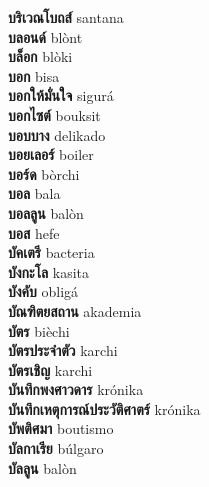 \textbf{ บริเวณโบถส์  } santana \\
\textbf{ บลอนด์  } blònt \\
\textbf{ บล็อก  } blòki \\
\textbf{ บอก  } bisa \\
\textbf{ บอกให้มั่นใจ  } sigurá \\
\textbf{ บอกไซต์  } bouksit \\
\textbf{ บอบบาง  } delikado \\
\textbf{ บอยเลอร์  } boiler \\
\textbf{ บอร์ด  } bòrchi \\
\textbf{ บอล  } bala \\
\textbf{ บอลลูน  } balòn \\
\textbf{ บอส  } hefe \\
\textbf{ บัคเตรี  } bacteria \\
\textbf{ บังกะโล  } kasita \\
\textbf{ บังคับ  } obligá \\
\textbf{ บัณฑิตยสถาน  } akademia \\
\textbf{ บัตร  } bièchi \\
\textbf{ บัตรประจำตัว  } karchi \\
\textbf{ บัตรเชิญ  } karchi \\
\textbf{ บันทึกพงศาวดาร  } krónika \\
\textbf{ บันทึกเหตุการณ์ประวัติศาตร์  } krónika \\
\textbf{ บัพติศมา  } boutismo \\
\textbf{ บัลกาเรีย  } búlgaro \\
\textbf{ บัลลูน  } balòn \\
